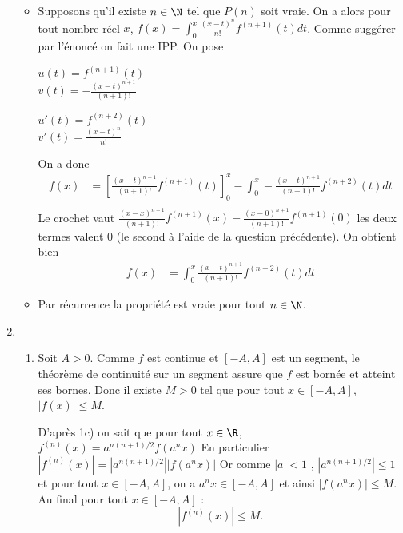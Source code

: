 \documentclass[a4paper, 11pt,reqno]{article}
\begin{document}
\begin{correction}
\begin{enumerate}
\begin{itemize}
\item Supposons qu'il existe $n\in \N$  tel que $P(n)$ soit vraie. On  a alors pour tout nombre réel $x$, $f(x) = \int_0^x \frac{(x-t)^n}{n!} f^{(n+1)} (t) dt$. 
Comme suggérer par l'énoncé on fait une IPP. On pose 
\begin{minipage}{0.4 \textwidth}
$u(t) = f^{(n+1)}(t)$\\
$v(t) = -\frac{(x-t)^{n+1}}{(n+1)!}$
\end{minipage}
\begin{minipage}{0.4 \textwidth}
$u'(t) = f^{(n+2)}(t)$\\
$v'(t) = \frac{(x-t)^{n}}{n!}$
\end{minipage}
On a donc 
\begin{align*}
f(x)&=\left[ \frac{(x-t)^{n+1}}{(n+1)!}  f^{(n+1)}(t)\right]_0^x - \int_0^x - \frac{(x-t)^{n+1}}{(n+1)!}f^{(n+2)}(t)dt\\
\end{align*}
Le crochet vaut $\frac{(x-x)^{n+1}}{(n+1)!}  f^{(n+1)}(x)- \frac{(x-0)^{n+1}}{(n+1)!}  f^{(n+1)}(0)$ les deux termes valent 0 (le second à l'aide de la question précédente). On obtient bien 
 \begin{align*}
f(x)&=  \int_0^x  \frac{(x-t)^{n+1}}{(n+1)!}f^{(n+2)}(t)dt
\end{align*}
\item Par récurrence la propriété est vraie pour tout $n\in \N$. 
\end{itemize}
\item \begin{enumerate}
\item Soit $A>0$. Comme $f$ est continue et $[-A,A]$ est un segment, le théorème de continuité sur un segment assure que $f$ est bornée et atteint ses bornes. Donc il existe $M>0$ tel que pour tout $x\in [-A,A]$, $|f(x)|\leq M$.

D'après 1c) on sait que pour tout $x\in \R$, $f^{(n)} (x) = a^{n(n+1)/2} f(a^n x)$ En particulier $|f^{(n)} (x)| =|a^{n(n+1)/2}| | f(a^n x)|$ 
Or comme $|a|<1$ , $|a^{n(n+1)/2}|  \leq 1$ et pour tout $x\in [-A,A]$, on a $a^n x \in  [-A,A]$ et ainsi $ | f(a^n x)| \leq M$. Au final pour tout  $x\in [-A,A]$ : 
$$|f^{(n)} (x)|\leq M.$$



\end{enumerate}
\end{enumerate}
\end{correction}
\end{document}
